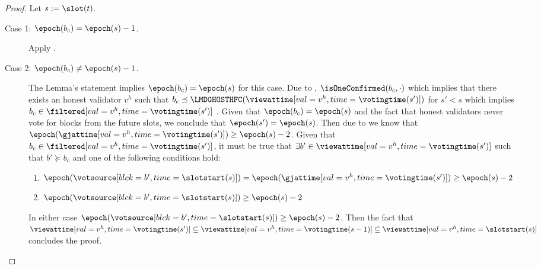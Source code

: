 \documentclass{article}
\begin{document}
\begin{proof}
    Let $s := \slot(t)$.
    \begin{description}
        \item[Case 1: {$\epoch(b_c) = \epoch(s)-1$}.] Apply .
        \item[Case 2: {$\epoch(b_c) \neq \epoch(s)-1$}.] The Lemma's statement implies $\epoch(b_c) = \epoch(s)$ for this case.
        Due to , $\isOneConfirmed(b_c, \cdot)$ which implies that there exists an honest validator $v^h$ such that
        $b_c \preceq \LMDGHOSTHFC(\viewattime[val=v^h,time=\votingtime(s')])$ for $s'<s$ which implies $b_c \in \filtered[val=v^h,time=\votingtime(s')]$ . Given that $\epoch(b_c) = \epoch(s)$ and the fact that honest validators never vote for blocks from the future slots, we conclude that $\epoch(s') = \epoch(s)$.
        Then due to  we know that $\epoch(\gjattime[val=v^h,time=\votingtime(s')]) \geq \epoch(s)-2$.
        Given that $b_c \in \filtered[val=v^h,time=\votingtime(s')]$, it must be true that $\exists b' \in \viewattime[val=v^h,time=\votingtime(s')]$ such that $b' \succeq b_c$ and one of the following conditions hold:
        \begin{enumerate}
            \item $\epoch(\votsource[blck=b',time=\slotstart(s)]) = \epoch(\gjattime[val=v^h,time=\votingtime(s')]) \geq \epoch(s)-2$
            \item $\epoch(\votsource[blck=b',time=\slotstart(s)]) \geq \epoch(s)-2$
        \end{enumerate}
        In either case $\epoch(\votsource[blck=b',time=\slotstart(s)]) \geq \epoch(s)-2$.
        Then the fact that $\viewattime[val=v^h,time=\votingtime(s')] \subseteq \viewattime[val=v^h,time=\votingtime(s-1)] \subseteq \viewattime[val=v^h, time=\slotstart(s)]$ concludes the proof.
    \end{description}
\end{proof}

\end{document}
